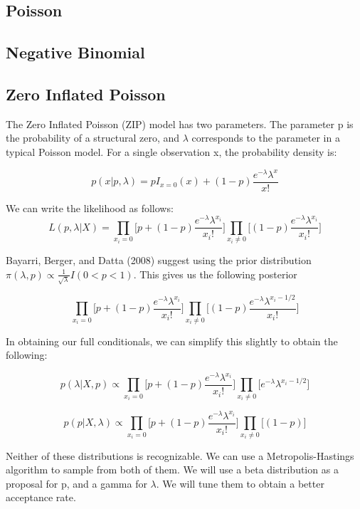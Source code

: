 \documentclass{article}\usepackage[]{graphicx}\usepackage[]{color}
\begin{document}
\subsection{Poisson}
\label{ss:mPoisson}

\subsection{Negative Binomial}
\label{ss:mNBinom}


\subsection{Zero Inflated Poisson}
\label{ss:mZiPoisson}
The Zero Inflated Poisson (ZIP) model has two parameters. The parameter p is the probability of a structural zero, and $\lambda$ corresponds to the parameter in a typical Poisson model. For a single observation x, the probability density is:

\[
p(x|p, \lambda) = pI_{x=0}(x) + (1-p)\frac{e^{-\lambda}\lambda^x}{x!}
\]


\noindent We can write the likelihood as follows:
$$
L(p, \lambda|X) = \prod_{x_i=0}\bigg[p+(1-p)\frac{e^{-\lambda}\lambda^{x_i}}{x_i!}\bigg]\prod_{x_i \ne 0}\bigg[(1-p)\frac{e^{-\lambda}\lambda^{x_i}}{x_i!}\bigg]
$$

\noindent Bayarri, Berger, and Datta (2008) \cite{ZIP} suggest using the prior distribution $\pi(\lambda, p) \propto \frac{1}{\sqrt{\lambda}}I(0<p<1)$. This gives us the following posterior 

\[
\prod_{x_i=0}\bigg[p+(1-p)\frac{e^{-\lambda}\lambda^{x_i}}{x_i!}\bigg]\prod_{x_i \ne 0}\bigg[(1-p)\frac{e^{-\lambda}\lambda^{x_i - 1/2}}{x_i!}\bigg]
\]

\noindent In obtaining our full conditionals, we can simplify this slightly to obtain the following:

\[
p(\lambda|X, p) \propto \prod_{x_i=0}\bigg[p+(1-p)\frac{e^{-\lambda}\lambda^{x_i}}{x_i!}\bigg]\prod_{x_i \ne 0}\bigg[e^{-\lambda}\lambda^{x_i - 1/2}\bigg]
\]

\[
p(p|X, \lambda) \propto \prod_{x_i=0}\bigg[p+(1-p)\frac{e^{-\lambda}\lambda^{x_i}}{x_i!}\bigg]\prod_{x_i \ne 0}\bigg[(1-p)\bigg]
\]

\noindent Neither of these distributions is recognizable. We can use a Metropolis-Hastings algorithm to sample from both of them. We will use a beta distribution as a proposal for p, and a gamma for $\lambda$. We will tune them to obtain a better acceptance rate. 
\end{document}

